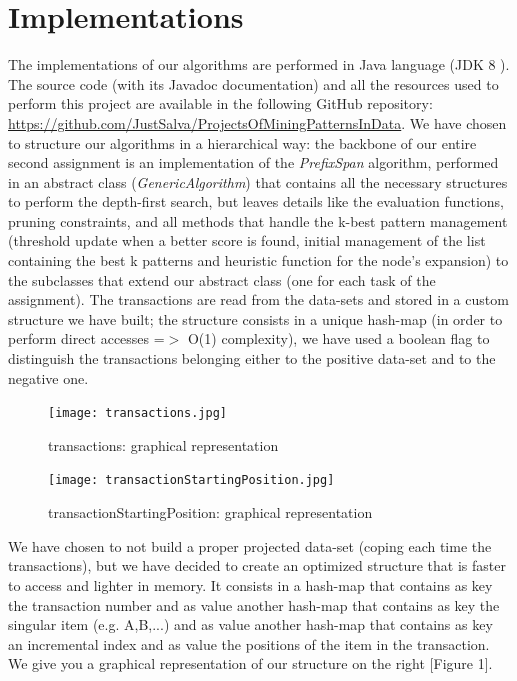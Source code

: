 \documentclass[10pt, a4paper]{article}
\begin{document}
	\section{Implementations}
	The implementations of our algorithms are performed in Java language (JDK 8 ).
	The source code (with its Javadoc documentation) and all the resources used to perform this project are available in the following GitHub repository: \url{https://github.com/JustSalva/ProjectsOfMiningPatternsInData}.\newline\newline
	We have chosen to structure our algorithms in a hierarchical way: the backbone of our entire second assignment is an implementation of the \textit{PrefixSpan} algorithm, performed in an abstract class (\textit{GenericAlgorithm}) that contains all the necessary structures to perform the depth-first search, but leaves details like the evaluation functions, pruning constraints, and all methods that handle the k-best pattern management (threshold update when a better score is found, initial management of the list containing the best k patterns and heuristic function for the node's expansion) to the subclasses that extend our abstract class (one for each task of the assignment).
	The transactions are read from the data-sets and stored in a custom structure we have built; the structure consists in a unique hash-map (in order to perform direct accesses =$>$ O(1) complexity), we have used a boolean flag to distinguish the transactions belonging either to the positive data-set and to the negative one.\newline
	\begin{figure}
		\centering
		\texttt{[image: transactions.jpg]}
		\caption{{\small  transactions: graphical representation}}
		\vspace{0.5cm}
		\texttt{[image: transactionStartingPosition.jpg]}
		\caption{{\small transactionStartingPosition: graphical representation}}
	\end{figure}
	We have chosen to not build a proper projected data-set (coping each time the transactions), but we have decided to create an optimized structure that is faster to access and lighter in memory. It consists in a hash-map that contains as key the transaction number and as value another hash-map that contains as key the singular item (e.g. A,B,...) and as value another hash-map that contains as key an incremental index and as value the positions of the item in the transaction. We give you a graphical representation of our structure on the right [Figure 1].
\end{document}
